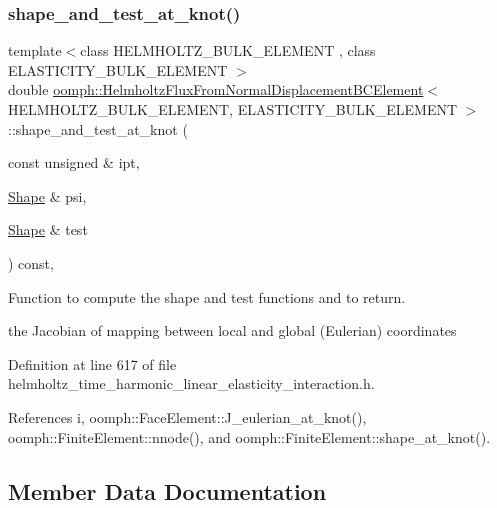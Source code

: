 \subsubsection{\texorpdfstring{shape\+\_\+and\+\_\+test\+\_\+at\+\_\+knot()}{shape\_and\_test\_at\_knot()}}
{\footnotesize\ttfamily template$<$class H\+E\+L\+M\+H\+O\+L\+T\+Z\+\_\+\+B\+U\+L\+K\+\_\+\+E\+L\+E\+M\+E\+NT , class E\+L\+A\+S\+T\+I\+C\+I\+T\+Y\+\_\+\+B\+U\+L\+K\+\_\+\+E\+L\+E\+M\+E\+NT $>$ \\
double \hyperlink{classoomph_1_1HelmholtzFluxFromNormalDisplacementBCElement}{oomph\+::\+Helmholtz\+Flux\+From\+Normal\+Displacement\+B\+C\+Element}$<$ H\+E\+L\+M\+H\+O\+L\+T\+Z\+\_\+\+B\+U\+L\+K\+\_\+\+E\+L\+E\+M\+E\+NT, E\+L\+A\+S\+T\+I\+C\+I\+T\+Y\+\_\+\+B\+U\+L\+K\+\_\+\+E\+L\+E\+M\+E\+NT $>$\+::shape\+\_\+and\+\_\+test\+\_\+at\+\_\+knot (\begin{DoxyParamCaption}\item[{const unsigned \&}]{ipt,  }\item[{\hyperlink{classoomph_1_1Shape}{Shape} \&}]{psi,  }\item[{\hyperlink{classoomph_1_1Shape}{Shape} \&}]{test }\end{DoxyParamCaption}) const\hspace{0.3cm}{\ttfamily [inline]}, {\ttfamily [protected]}}



Function to compute the shape and test functions and to return. 

the Jacobian of mapping between local and global (Eulerian) coordinates 

Definition at line 617 of file helmholtz\+\_\+time\+\_\+harmonic\+\_\+linear\+\_\+elasticity\+\_\+interaction.\+h.



References i, oomph\+::\+Face\+Element\+::\+J\+\_\+eulerian\+\_\+at\+\_\+knot(), oomph\+::\+Finite\+Element\+::nnode(), and oomph\+::\+Finite\+Element\+::shape\+\_\+at\+\_\+knot().



\subsection{Member Data Documentation}
\mbox{\label{classoomph_1_1HelmholtzFluxFromNormalDisplacementBCElement_a72d189d7598def4ce0ce2aecdc93bcd9}} 
